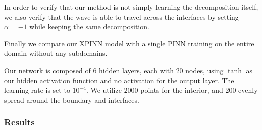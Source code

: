 In order to verify that our method is not simply learning the decomposition itself, we also verify that the wave is able to travel across the interfaces by setting $\alpha = -1$ while keeping the same decomposition.

Finally we compare our XPINN model with a single PINN training on the entire domain without any subdomains. 

Our network is composed of $6$ hidden layers, each with $20$ nodes, using $\tanh$ as our hidden activation function and no activation for the output layer. The learning rate is set to $10^{-4}$.
We utilize $2000$ points for the interior, and $200$ evenly spread around the boundary and interfaces. 

\subsubsection{Results}

\begin{figure}
\label{subfig:0.5_predictions}
\label{fig:0.5_advection}
\end{figure}


